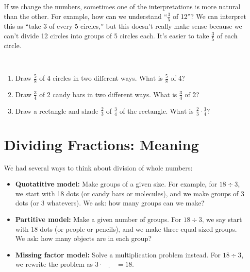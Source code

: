 If we change the numbers, sometimes one of the interpretations is more natural than the other.  For example, how can we understand ``$\frac 3 5$ of 12''?  We can interpret this as ``take 3 of every 5 circles,'' but this doesn't really make sense because we can't divide 12 circles into groups of 5 circles each.  It's easier to take $\frac 3 5$ of each circle.



\begin{thinkpair*}\ 
\begin{enumerate}
\item
Draw $\frac 5 8$ of 4 circles in two different ways.  What is $\frac 5 8$ of 4?\\
\item
 Draw $\frac 3 4$ of 2 candy bars in two different ways.  What is $\frac 3 4$ of 2?\\
 \item
 Draw a rectangle and shade $\frac 2 3$ of $\frac 3 4$ of the rectangle.  What is $\frac 23 \cdot \frac 3 4$?\
 \end{enumerate}

\end{thinkpair*}






\section{Dividing Fractions: Meaning}
We had several ways to think about division of whole numbers:
\begin{itemize}
\item
{\bf Quotatitive model:} Make groups of a given size.  For example, for $18 \div 3$, we start with 18 dots (or candy bars or molecules), and we make groups of 3 dots (or 3 whatevers).  We ask: how many groups can we make?\\

\item
{\bf Partitive model:} Make a given number of groups.  For $18 \div 3$, we say start with 18 dots (or people or pencils), and we make three equal-sized groups.  We ask: how many objects are in each group?\\

\item
{\bf Missing factor model:} Solve a multiplication problem instead.  For $18 \div 3$, we rewrite the problem as $3 \cdot \underline{\qquad} = 18$.\\
\end{itemize}


